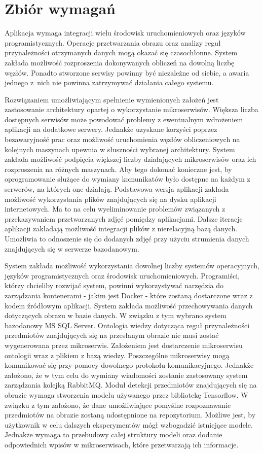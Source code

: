 \section{Zbiór wymagań}{
Aplikacja wymaga integracji wielu środowisk uruchomieniowych oraz języków programistycznych. Operacje przetwarzania obrazu oraz analizy reguł przynależności otrzymanych danych mogą okazać się czasochłonne. System zakłada możliwość rozproszenia dokonywanych obliczeń na dowolną liczbę węzłów. Ponadto stworzone serwisy powinny być niezależne od siebie, a awaria jednego z~nich nie powinna zatrzymywać działania całego systemu. 

Rozwiązaniem umożliwiającym spełnienie wymienionych założeń jest zastosowanie architektury opartej o wykorzystanie mikroserwisów. Większa liczba dostępnych serwisów może powodować problemy z ewentualnym wdrożeniem aplikacji na dodatkowe serwery. Jednakże uzyskane korzyści poprzez bezawaryjność prac oraz możliwość uruchomienia węzłów obliczeniowych na kolejnych maszynach upewnia w słuszności wybranej architektury. System zakłada możliwość podpięcia większej liczby działających mikroserwisów oraz ich rozproszenia na różnych maszynach. Aby tego dokonać konieczne jest, by oprogramowanie służące do wymiany komunikatów było dostępne na każdym z serwerów, na których one działają. Podstawowa wersja aplikacji zakłada możliwość wykorzystania plików znajdujących się na dysku aplikacji internetowych. Ma to na celu wyeliminowanie problemów związanych z przekazywaniem przetwarzanych zdjęć pomiędzy aplikacjami. Dalsze iteracje aplikacji zakładają możliwość integracji plików z nierelacyjną bazą danych. Umożliwia to odnoszenie się do dodanych zdjęć przy użyciu strumienia danych znajdujących się w serwerze bazodanowym.

System zakłada możliwość wykorzystania dowolnej liczby systemów operacyjnych, języków programistycznych oraz środowisk uruchomieniowych. Programiści, którzy chcieliby rozwijać system, powinni wykorzystywać narzędzia do zarządzania kontenerami - jakim jest Docker \cite{Docker}- które zostaną dostarczone wraz z kodem źródłowym aplikacji. System zakłada możliwość przechowywania danych dotyczących obrazu w bazie danych. W związku z tym wybrano system bazodanowy MS SQL Server. Ontologia wiedzy dotycząca reguł przynależności przedmiotów znajdujących się na przesłanym obrazie nie musi zostać wygenerowana przez mikroserwis. Założeniem jest dostarczenie mikroserwisu ontologii wraz z plikiem z bazą wiedzy. Poszczególne mikroserwisy mogą komunikować się przy pomocy dowolnego protokołu komunikacyjnego. Jednakże założono, że w tym celu do wymiany wiadomości zostanie zastosowany system zarządzania kolejką RabbitMQ. Moduł detekcji przedmiotów znajdujących się na obrazie wymaga stworzenia modelu używanego przez bibliotekę Tensorflow. W związku z tym założono, że dane umożliwiające pomyślne rozpoznawanie przedmiotów na obrazie zostaną udostępnione na repozytorium. Możliwe jest, by użytkownik w celu dalszych eksperymentów mógł wzbogadzić istniejące modele. Jednakże wymaga to przebudowy całej struktury modeli oraz dodanie odpowiednich wpisów w mikroserwisach, które przetwarzają ich informacje.
}

